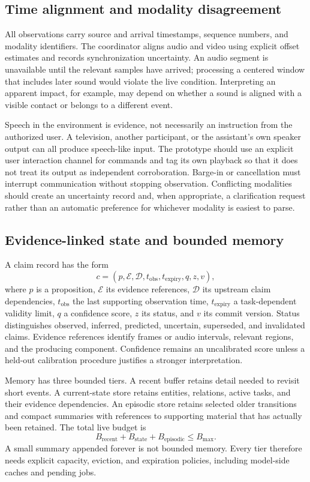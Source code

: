 \documentclass[11pt,letterpaper]{article}
\begin{document}
\subsection{Time alignment and modality disagreement}
All observations carry source and arrival timestamps, sequence numbers, and modality identifiers. The coordinator aligns audio and video using explicit offset estimates and records synchronization uncertainty. An audio segment is unavailable until the relevant samples have arrived; processing a centered window that includes later sound would violate the live condition. Interpreting an apparent impact, for example, may depend on whether a sound is aligned with a visible contact or belongs to a different event.

Speech in the environment is evidence, not necessarily an instruction from the authorized user. A television, another participant, or the assistant's own speaker output can all produce speech-like input. The prototype should use an explicit user interaction channel for commands and tag its own playback so that it does not treat its output as independent corroboration. Barge-in or cancellation must interrupt communication without stopping observation. Conflicting modalities should create an uncertainty record and, when appropriate, a clarification request rather than an automatic preference for whichever modality is easiest to parse.

\subsection{Evidence-linked state and bounded memory}
A claim record has the form
\begin{equation}
 c=(p,\mathcal{E},\mathcal{D},t_{\mathrm{obs}},t_{\mathrm{expiry}},q,z,v),
 \label{eq:claim}
\end{equation}
where $p$ is a proposition, $\mathcal{E}$ its evidence references, $\mathcal{D}$ its upstream claim dependencies, $t_{\mathrm{obs}}$ the last supporting observation time, $t_{\mathrm{expiry}}$ a task-dependent validity limit, $q$ a confidence score, $z$ its status, and $v$ its commit version. Status distinguishes observed, inferred, predicted, uncertain, superseded, and invalidated claims. Evidence references identify frames or audio intervals, relevant regions, and the producing component. Confidence remains an uncalibrated score unless a held-out calibration procedure justifies a stronger interpretation.

Memory has three bounded tiers. A recent buffer retains detail needed to revisit short events. A current-state store retains entities, relations, active tasks, and their evidence dependencies. An episodic store retains selected older transitions and compact summaries with references to supporting material that has actually been retained. The total live budget is
\begin{equation}
 B_{\mathrm{recent}}+B_{\mathrm{state}}+B_{\mathrm{episodic}}\leq B_{\max}.
 \label{eq:memory}
\end{equation}
A small summary appended forever is not bounded memory. Every tier therefore needs explicit capacity, eviction, and expiration policies, including model-side caches and pending jobs.
\end{document}
